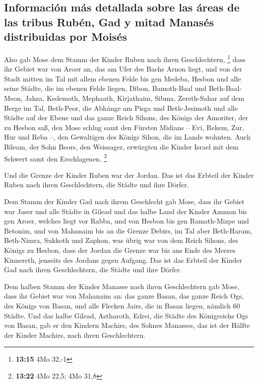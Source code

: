 \hypertarget{informaciuxf3n-muxe1s-detallada-sobre-las-uxe1reas-de-las-tribus-rubuxe9n-gad-y-mitad-manasuxe9s-distribuidas-por-moisuxe9s}{%
\subsection{Información más detallada sobre las áreas de las tribus
Rubén, Gad y mitad Manasés distribuidas por
Moisés}\label{informaciuxf3n-muxe1s-detallada-sobre-las-uxe1reas-de-las-tribus-rubuxe9n-gad-y-mitad-manasuxe9s-distribuidas-por-moisuxe9s}}

 Also gab Mose dem Stamm der Kinder Ruben nach ihren
Geschlechtern, \footnote{\textbf{13:15} 4Mo 32,-1}  dass
ihr Gebiet war von Aroer an, das am Ufer des Bachs Arnon liegt, und von
der Stadt mitten im Tal mit allem ebenen Felde bis gen Medeba,
 Hesbon und alle seine Städte, die im ebenen Felde
liegen, Dibon, Bamoth-Baal und Beth-Baal-Meon,  Jahza,
Kedemoth, Mephaath,  Kirjathaim, Sibma, Zereth-Sahar auf
dem Berge im Tal,  Beth-Peor, die Abhänge am Pisga und
Beth-Jesimoth  und alle Städte auf der Ebene und das
ganze Reich Sihons, des Königs der Amoriter, der zu Hesbon saß, den Mose
schlug samt den Fürsten Midians -- Evi, Rekem, Zur, Hur und Reba --, den
Gewaltigen des Königs Sihon, die im Lande wohnten.  Auch
Bileam, der Sohn Beors, den Weissager, erwürgten die Kinder Israel mit
dem Schwert samt den Erschlagenen. \footnote{\textbf{13:22} 4Mo 22,5;
  4Mo 31,8}

 Und die Grenze der Kinder Ruben war der Jordan. Das ist
das Erbteil der Kinder Ruben nach ihren Geschlechtern, die Städte und
ihre Dörfer.

 Dem Stamm der Kinder Gad nach ihrem Geschlecht gab Mose,
 dass ihr Gebiet war Jaser und alle Städte in Gilead und
das halbe Land der Kinder Ammon bis gen Aroer, welches liegt vor Rabba,
 und von Hesbon bis gen Ramath-Mizpe und Betonim, und von
Mahanaim bis an die Grenze Debirs,  im Tal aber
Beth-Haram, Beth-Nimra, Sukkoth und Zaphon, was übrig war von dem Reich
Sihons, des Königs zu Hesbon, dass der Jordan die Grenze war bis ans
Ende des Meeres Kinnereth, jenseits des Jordans gegen Aufgang.
 Das ist das Erbteil der Kinder Gad nach ihren
Geschlechtern, die Städte und ihre Dörfer.

 Dem halben Stamm der Kinder Manasse nach ihren
Geschlechtern gab Mose,  dass ihr Gebiet war von Mahanaim
an: das ganze Basan, das ganze Reich Ogs, des Königs von Basan, und alle
Flecken Jairs, die in Basan liegen, nämlich 60 Städte. 
Und das halbe Gilead, Astharoth, Edrei, die Städte des Königreichs Ogs
von Basan, gab er den Kindern Machirs, des Sohnes Manasses, das ist der
Hälfte der Kinder Machirs, nach ihren Geschlechtern.


